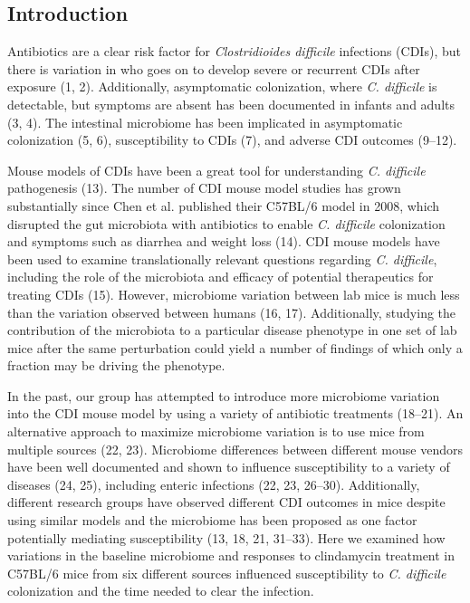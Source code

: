 \documentclass[11pt,]{article}
\begin{document}
\newpage

\subsection{Introduction}\label{introduction}

Antibiotics are a clear risk factor for \emph{Clostridioides difficile}
infections (CDIs), but there is variation in who goes on to develop
severe or recurrent CDIs after exposure (1, 2). Additionally,
asymptomatic colonization, where \emph{C. difficile} is detectable, but
symptoms are absent has been documented in infants and adults (3, 4).
The intestinal microbiome has been implicated in asymptomatic
colonization (5, 6), susceptibility to CDIs (7), and adverse CDI
outcomes (9--12).

Mouse models of CDIs have been a great tool for understanding \emph{C.
difficile} pathogenesis (13). The number of CDI mouse model studies has
grown substantially since Chen et al. published their C57BL/6 model in
2008, which disrupted the gut microbiota with antibiotics to enable
\emph{C. difficile} colonization and symptoms such as diarrhea and
weight loss (14). CDI mouse models have been used to examine
translationally relevant questions regarding \emph{C. difficile},
including the role of the microbiota and efficacy of potential
therapeutics for treating CDIs (15). However, microbiome variation
between lab mice is much less than the variation observed between humans
(16, 17). Additionally, studying the contribution of the microbiota to a
particular disease phenotype in one set of lab mice after the same
perturbation could yield a number of findings of which only a fraction
may be driving the phenotype.

In the past, our group has attempted to introduce more microbiome
variation into the CDI mouse model by using a variety of antibiotic
treatments (18--21). An alternative approach to maximize microbiome
variation is to use mice from multiple sources (22, 23). Microbiome
differences between different mouse vendors have been well documented
and shown to influence susceptibility to a variety of diseases (24, 25),
including enteric infections (22, 23, 26--30). Additionally, different
research groups have observed different CDI outcomes in mice despite
using similar models and the microbiome has been proposed as one factor
potentially mediating susceptibility (13, 18, 21, 31--33). Here we
examined how variations in the baseline microbiome and responses to
clindamycin treatment in C57BL/6 mice from six different sources
influenced susceptibility to \emph{C. difficile} colonization and the
time needed to clear the infection.
\end{document}
